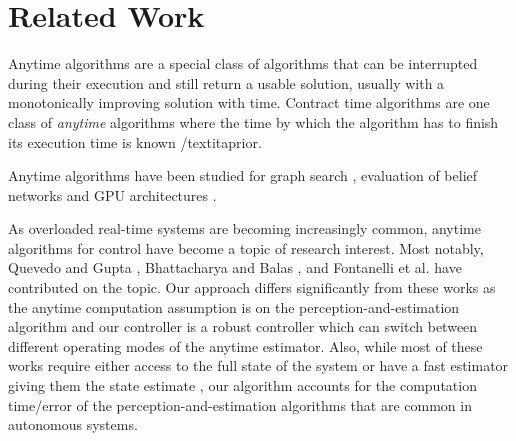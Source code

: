 \section{Related Work}
\label{related}

Anytime algorithms \cite{boddy} are a special class of algorithms that can be interrupted during their execution and still return a usable solution, usually with a monotonically improving solution with time. Contract time algorithms \cite{zilbersteinAImag} are one class of \emph{anytime} algorithms where the time by which the algorithm has to finish its execution time is known /textit{aprior}.


Anytime algorithms have been studied for graph search \cite{maxim}, evaluation of belief networks \cite{wellman} and GPU architectures \cite{RTSSanytime}.

As overloaded real-time systems are becoming increasingly common, anytime algorithms for control have become a topic of research interest. Most notably, Quevedo and Gupta \cite{sequence}, Bhattacharya and Balas \cite{balas}, and Fontanelli et al. \cite{fontanelli} have contributed on the topic. Our approach differs significantly from these works as the anytime computation assumption is on the perception-and-estimation algorithm and our controller is a robust controller which can switch between different operating modes of the anytime estimator. Also, while most of these works require either access to the full state of the system or have a fast estimator giving them the state estimate \cite{balas}, our algorithm accounts for the computation time/error of the perception-and-estimation algorithms that are common in autonomous systems.

